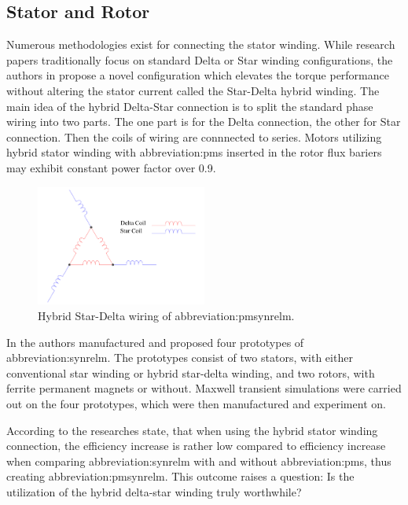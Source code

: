 \documentclass[a4paper, twoside, 11pt]{article}
\begin{document}
    \subsection{Stator and Rotor}
        Numerous methodologies exist for connecting the stator winding. While research papers traditionally focus on standard Delta or Star winding configurations, the authors in \cite{ibrahim-an-improved-torque-density-synchronous-reluctance-machine-with-a-combined-star-delta-winding-layout, ibrahim-permanent-magnet-assisted-synchronous-reluctance-motor-employing-a-hybrid-star-delta-winding-for-high-speed-applicaitons} propose a novel configuration which elevates the torque performance without altering the stator current called the Star-Delta hybrid winding. The main idea of the hybrid Delta-Star connection is to split the standard phase wiring into two parts. The one part is for the Delta connection, the other for Star connection. Then the coils of wiring are connnected to series. Motors utilizing hybrid stator winding with \gls{abbreviation:pm}s inserted in the rotor flux bariers may exhibit constant power factor over 0.9. \cite{ibrahim-permanent-magnet-assisted-synchronous-reluctance-motor-employing-a-hybrid-star-delta-winding-for-high-speed-applicaitons}

        \begin{figure}[htbp!]
            \centering
            \includegraphics[width=0.5\textwidth]{src/pdf/hybrid-star-delta-wiring.pdf}
            \caption{Hybrid Star-Delta wiring of \gls{abbreviation:pmsynrelm}.}
            \label{fig:hybrid-star-delta-wiring}
        \end{figure}

        In \cite{ibrahim-permanent-magnet-assisted-synchronous-reluctance-motor-employing-a-hybrid-star-delta-winding-for-high-speed-applicaitons} the authors manufactured and proposed four prototypes of \gls{abbreviation:synrelm}. The prototypes consist of two stators, with either conventional star winding or hybrid star-delta winding, and two rotors, with ferrite permanent magnets or without. Maxwell transient simulations were carried out on the four prototypes, which were then manufactured and experiment on.\par
    According to \cite{ibrahim-permanent-magnet-assisted-synchronous-reluctance-motor-employing-a-hybrid-star-delta-winding-for-high-speed-applicaitons} the researches state, that when using the hybrid stator winding connection, the efficiency increase is rather low compared to efficiency increase when comparing \gls{abbreviation:synrelm} with and without \gls{abbreviation:pm}s, thus creating \gls{abbreviation:pmsynrelm}. This outcome raises a question: Is the utilization of the hybrid delta-star winding truly worthwhile?\par
\end{document}
